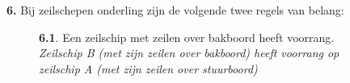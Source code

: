 \textbf{6.} Bij zeilschepen onderling zijn de volgende twee regels van belang:
\vspace{-0.5cm}
\begin{figure}[H]
	\centering
	\hspace{0.02\textwidth}
	\begin{minipage}[t]{0.70\textwidth}
		\textbf{6.1}. Een zeilschip met zeilen over bakboord heeft voorrang.\\
		\textit{Zeilschip B (met zijn zeilen over bakboord) heeft voorrang op \\zeilschip A (met zijn zeilen over stuurboord)}
	\end{minipage}
	\hfill
	\begin{minipage}[t]{0.20\textwidth}
		\label{pic:kr41}
	\end{minipage}
	\hfill
\end{figure}

